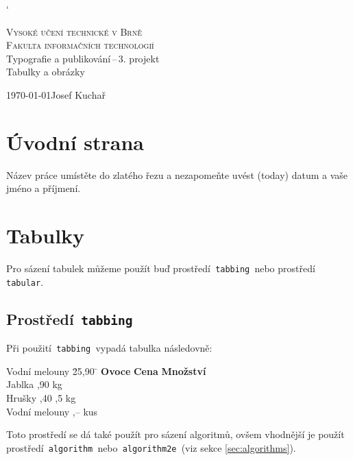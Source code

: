 \documentclass[11pt]{article}
\begin{document}
\catcode`

\begin{titlepage}
    \begin{center}
        \Huge \textsc{Vysoké učení technické v Brně} \\
        \huge \textsc{Fakulta informačních technologií} \\
        \LARGE{Typografie a publikování\,--\,3. projekt} \\
        \Huge {Tabulky a obrázky}
    \end{center}
    {\Large \today \hfill Josef Kuchař}
    \bigskip
\end{titlepage}

\section{Úvodní strana}
Název práce umístěte do zlatého řezu a nezapomeňte uvést  (today) datum a vaše jméno a příjmení.

\section{Tabulky}
Pro sázení tabulek můžeme použít buď prostředí\texttt{ tabbing }nebo prostředí\texttt{ tabular}.

\subsection{Prostředí\texttt{ tabbing}}
Při použití\texttt{ tabbing }vypadá tabulka následovně:
\begin{tabbing}
    Vodní melouny \quad \= 25,90 \quad \= \kill
    \textbf{Ovoce} \> \textbf{Cena} \> \textbf{Množství} \\
    Jablka ,90  kg \\
    Hrušky ,40 ,5 kg \\
    Vodní melouny ,--  kus \\
\end{tabbing}
Toto prostředí se dá také použít pro sázení algoritmů, ovšem vhodnější je použít prostředí\texttt{ algorithm }nebo\texttt{ algorithm2e }(viz sekce \ref{sec:algorithms}).
\end{document}
